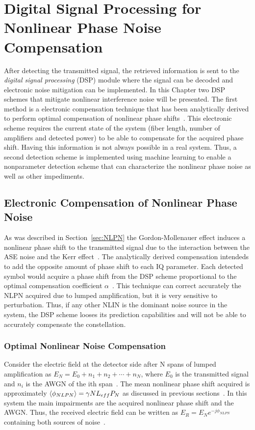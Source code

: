 



\chapter{Digital Signal Processing for Nonlinear Phase Noise Compensation}\label{ch:DSP}

After detecting the transmitted signal, the retrieved information is sent to the \textit{digital signal processing} (DSP) module where the signal can be decoded and electronic noise mitigation can be implemented. In this Chapter two DSP schemes that mitigate nonlinear interference noise will be presented. The first method is a electronic compensation technique that has been analytically derived to perform optimal compensation of nonlinear phase shifts~\cite{NLPNDSP,liu2002improving}. This electronic scheme requires the current state of the system (fiber length, number of amplifiers and detected power) to be able to compensate for the acquired phase shift. Having this information is not always possible in a real system. Thus, a second detection scheme is implemented using machine learning to enable a nonparameter detection scheme that can characterize the  nonlinear phase noise as well as other impediments. 


\section{Electronic Compensation of Nonlinear Phase Noise } \label{sec:DSPdig}
As was described in Section~\ref{sec:NLPN} the Gordon-Mollenauer effect induces a nonlinear phase shift to the transmitted signal due to the interaction between the ASE noise and the Kerr effect~\cite{gordon1990phase}. The analytically derived compensation intendeds to add the opposite amount of phase shift to each IQ parameter. Each detected symbol would acquire a phase shift from the DSP scheme proportional to the optimal compensation coefficient $\alpha$~\cite{liu2002improving}. This technique can correct accurately the NLPN acquired due to lumped amplification, but it is very sensitive to perturbation. Thus, if any other NLIN is the dominant noise source in the system, the DSP scheme looses its prediction capabilities and will not be able to accurately compensate the constellation.~\\

\subsection{Optimal Nonlinear Noise Compensation }
Consider the electric field at the detector side after N spans of lumped amplification as $E_{N}=E_{0}+n_{1}+n_{2}+\cdots+n_{N}$, where $E_{0}$ is the transmitted signal and $n_{i}$ is the AWGN of the ith span~\cite{gordon1990phase}. The mean nonlinear phase shift acquired is approximately $\braket{\phi_{NLPN}}=\gamma N L_{eff}P_{N}$ as discussed in previous sections~\cite{NLPNDSP,FiberAgrawal}. In this system the main impairments are the acquired nonlinear phase shift and the AWGN. Thus, the received electric field can be written as  $E_{R}=E_{N}e^{-j\phi_{NLPN}}$ containing both sources of noise~\cite{NLPNDSP}.~\\

